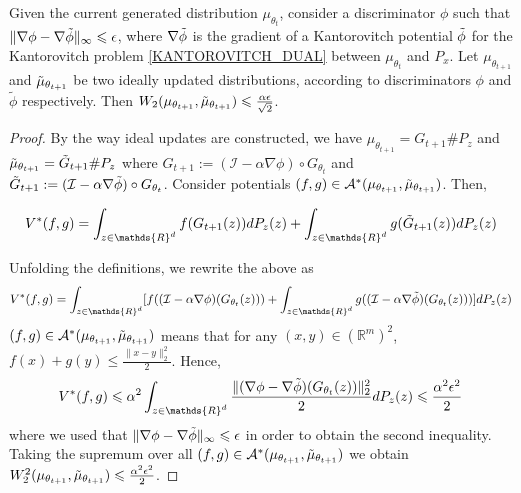 \documentclass[runningheads]{llncs}
\newcommand{\id}{\mathcal{I}}
\begin{document}
\begin{proposition}
\normalfont
\label{unperfect_discriminator}
Given the current generated distribution $\mu_{\theta_t}$, consider a discriminator $\phi$ such that $\|\nabla \phi - \nabla \Tilde{\phi}\|_{\infty}\leqslant \epsilon$, where $\nabla \Tilde{\phi}$ is the gradient of a Kantorovitch potential $\Tilde{\phi}$ for the Kantorovitch problem \eqref{KANTOROVITCH_DUAL} between $\mu_{\theta_t}$ and $P_x$. Let $\mu_{\theta_{t+1}}$ and $\Tilde{\mu}_{\theta_{t+1}}$ be two ideally updated distributions, according to discriminators $\phi$ and $\tilde{\phi}$ respectively. Then $W_2(\mu_{\theta_{t+1}},\Tilde{\mu}_{\theta_{t+1}})\leqslant \frac{\alpha \epsilon}{\sqrt{2}}$.  
\end{proposition}
\begin{proof}
By the way ideal updates are constructed, we have $\mu_{\theta_{t+1}}=G_{t+1}\#P_z$ and $\Tilde{\mu}_{\theta_{t+1}}=\Tilde{G}_{t+1}\#P_z$ where $G_{t+1}:=(\id-\alpha \nabla \phi)\circ G_{\theta_t}$ and $\Tilde{G}_{t+1}:=(\id-\alpha \nabla \Tilde{\phi})\circ G_{\theta_t}$. Consider potentials $(f,g)\in \mathcal{A}^*(\mu_{\theta_{t+1}},\Tilde{\mu}_{\theta_{t+1}})$. Then,

\[V^*(f,g)=\int_{z\in \mathds{R}^d} f(G_{t+1}(z))dP_z(z)+ \int_{z\in \mathds{R}^d} g(\Tilde{G}_{t+1}(z))dP_z(z)\]

Unfolding the definitions, we rewrite the above as
\[V^*(f,g)=\int_{z\in \mathds{R}^d} [f((\id-\alpha \nabla \phi)( G_{\theta_t}(z)))+ \int_{z\in \mathds{R}^d} g((\id-\alpha \nabla \Tilde{\phi})(G_{\theta_t}(z)))]dP_z(z)\]
$(f,g)\in \mathcal{A}^*(\mu_{\theta_{t+1}},\Tilde{\mu}_{\theta_{t+1}})$ means that for any $(x,y)\in (\mathds{R}^m)^2$, $f(x)+g(y)\leqslant \frac{\|x-y\|_2^2}{2}$. Hence,
\[V^*(f,g)\leqslant \alpha^2\int_{z\in \mathds{R}^d} \frac{\|(\nabla \phi-\nabla \Tilde{\phi})(G_{\theta_t}(z))\|_2^2}{2} dP_z(z)\leqslant \frac{\alpha^2\epsilon^2}{2}\]
where we used that $\|\nabla \phi - \nabla \Tilde{\phi}\|_{\infty}\leqslant \epsilon$ in order to obtain the second inequality. Taking the supremum over all $(f,g)\in \mathcal{A}^*(\mu_{\theta_{t+1}},\Tilde{\mu}_{\theta_{t+1}})$ we obtain $W_2^2(\mu_{\theta_{t+1}},\Tilde{\mu}_{\theta_{t+1}})\leqslant \frac{\alpha^2\epsilon^2}{2}$.
\end{proof}
\end{document}
